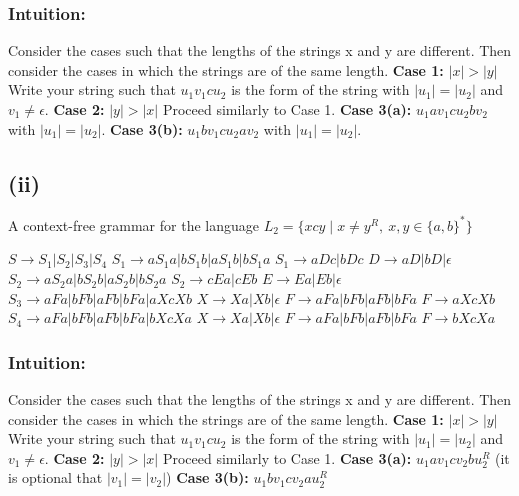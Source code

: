 \documentclass[12pt]{article}
\begin{document}
\subsubsection*{Intuition: }Consider the cases such that the lengths of the
strings x and y are different. Then consider the cases in which the strings are
of the same length.
\newline
\textbf{Case 1: }$|x| > |y|$ Write your string such that $u_1v_1cu_2$ is the
form of the string with $|u_1|=|u_2|$ and $v_1 \neq \epsilon$.
\newline
\textbf{Case 2: }$|y| > |x|$ Proceed similarly to Case 1.
\newline
\textbf{Case 3(a): }$u_1av_1cu_2bv_2$ with $|u_1|=|u_2|$.
\newline
\textbf{Case 3(b): }$u_1bv_1cu_2av_2$ with $|u_1|=|u_2|$.

\newpage
\subsection*{(ii)} A context-free grammar for the language
$L_2 = \{xcy \mid x\neq y^R,\ x,y\in\{a,b\}^*\}$
\begin{center}
\parbox{7cm}{
$S \rightarrow S_1|S_2|S_3|S_4$ \newline
$S_1 \rightarrow aS_1a|bS_1b|aS_1b|bS_1a$ \newline
$S_1 \rightarrow aDc|bDc$ \newline
$D \rightarrow aD|bD| \epsilon$ \newline
$S_2 \rightarrow aS_2a|bS_2b|aS_2b|bS_2a$ \newline
$S_2 \rightarrow cEa|cEb$ \newline
$E \rightarrow Ea|Eb| \epsilon$ \newline
$S_3 \rightarrow aFa|bFb|aFb|bFa|aXcXb$ \newline
$X \rightarrow Xa|Xb|\epsilon$ \newline
$F \rightarrow aFa|bFb|aFb|bFa$ \newline
$F \rightarrow aXcXb$ \newline
$S_4 \rightarrow aFa|bFb|aFb|bFa|bXcXa$ \newline
$X \rightarrow Xa|Xb|\epsilon$ \newline
$F \rightarrow aFa|bFb|aFb|bFa$ \newline
$F \rightarrow bXcXa$
}\end{center}

\subsubsection*{Intuition: }Consider the cases such that the lengths of
the strings x and y are different. Then consider the cases in which the strings
are of the same length.
\newline
\textbf{Case 1: }$|x| > |y|$ Write your string such that $u_1v_1cu_2$ is the
form of the string with $|u_1|=|u_2|$ and $v_1 \neq \epsilon$.
\newline
\textbf{Case 2: }$|y| > |x|$ Proceed similarly to Case 1.
\newline
\textbf{Case 3(a): }$u_1av_1cv_2bu_2^R$ (it is optional that $|v_1|=|v_2|$)
\newline
\textbf{Case 3(b): }$u_1bv_1cv_2au_2^R$
\end{document}
